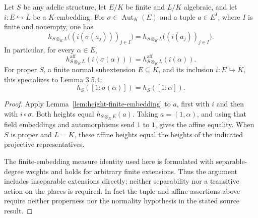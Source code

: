 \begin{lemma}
\label{lem:height-conjugate}
\leanok
Let $S$ be any adelic structure, let $E/K$ be finite and $L/K$
algebraic, and let $i:E\hookrightarrow L$ be a $K$-embedding.
For $\sigma\in\operatorname{Aut}_K(E)$ and a tuple
$a\in E^I$, where $I$ is finite and nonempty, one has
\[
 h_{S\otimes_K L}\bigl((i(\sigma(a_j)))_{j\in I}\bigr)
 =h_{S\otimes_K L}\bigl((i(a_j))_{j\in I}\bigr).
\]
In particular, for every $\alpha\in E$,
\[
 h_{S\otimes_K L}^{\mathrm{aff}}(i(\sigma(\alpha)))
 =h_{S\otimes_K L}^{\mathrm{aff}}(i(\alpha)).
\]
For proper $S$, a finite normal subextension
$E\subseteq\overline K$, and its inclusion $i:E\hookrightarrow\overline K$,
this specializes to Lemma 3.5.4:
\[
 h_S([1:\sigma(\alpha)])=h_S([1:\alpha]).
\]
\end{lemma}
\begin{proof}
Apply Lemma~\ref{lem:height-finite-embedding} to $a$, first with
$i$ and then with $i\circ\sigma$. Both heights equal
$h_{S\otimes_K E}(a)$. Taking $a=(1,\alpha)$, and using that
field embeddings and automorphisms send $1$ to $1$, gives the affine
equality. When $S$ is proper and $L=\overline K$, these affine
heights equal the heights of the indicated projective representatives.

The finite-embedding measure identity used here is formulated with
separable-degree weights and holds for arbitrary finite extensions.
Thus the argument includes inseparable extensions directly; neither
separability nor a transitive action on the places is required. In
fact the tuple and affine assertions above require neither properness
nor the normality hypothesis in the stated source result.
\end{proof}


